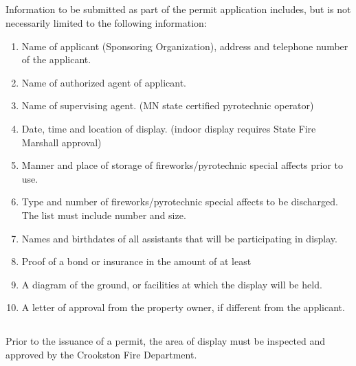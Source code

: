 \subsection{}
Information to be submitted as part of the permit application includes, but is not necessarily limited to the following information:
\begin{enumerate}[{\indent}1)]
    \item Name of applicant (Sponsoring Organization), address and telephone number of the applicant. 
    \item Name of authorized agent of applicant. 
    \item Name of supervising agent. (MN state certified pyrotechnic operator) 
    \item Date, time and location of display. (indoor display requires State Fire Marshall approval) 
    \item Manner and place of storage of fireworks/pyrotechnic special affects prior to use. 
    \item Type and number of fireworks/pyrotechnic special affects to be discharged.  The list must include number and size. 
    \item Names and birthdates of all assistants that will be participating in display. 
    \item Proof of a bond or insurance in the amount of at least 
    \item A diagram of the ground, or facilities at which the display will be held. 
    \item A letter of approval from the property owner, if different from the applicant. 
\end{enumerate}
\subsection{}
Prior to the issuance of a permit, the area of display must be inspected and approved by the Crookston Fire Department.
